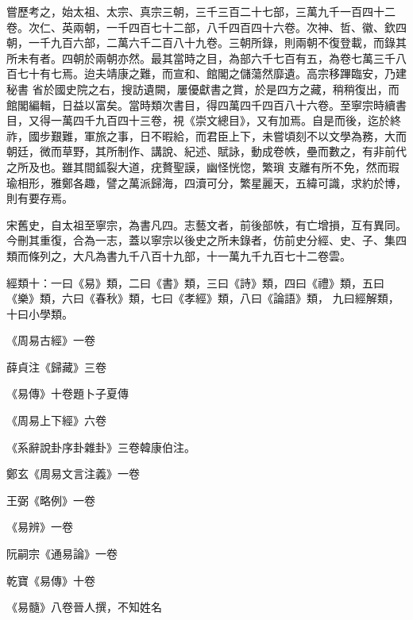 \begin{pinyinscope}
 嘗歷考之，始太祖、太宗、真宗三朝，三千三百二十七部，三萬九千一百四十二卷。次仁、英兩朝，一千四百七十二部，八千四百四十六卷。次神、哲、徽、欽四朝，一千九百六部，二萬六千二百八十九卷。三朝所錄，則兩朝不復登載，而錄其所未有者。四朝於兩朝亦然。最其當時之目，為部六千七百有五，為卷七萬三千八百七十有七焉。迨夫靖康之難，而宣和、館閣之儲蕩然靡遺。高宗移蹕臨安，乃建秘書
 省於國史院之右，搜訪遺闕，屢優獻書之賞，於是四方之藏，稍稍復出，而館閣編輯，日益以富矣。當時類次書目，得四萬四千四百八十六卷。至寧宗時續書目，又得一萬四千九百四十三卷，視《崇文總目》，又有加焉。自是而後，迄於終祚，國步艱難，軍旅之事，日不暇給，而君臣上下，未嘗頃刻不以文學為務，大而朝廷，微而草野，其所制作、講說、紀述、賦詠，動成卷帙，壘而數之，有非前代之所及也。雖其間鈲裂大道，疣贅聖謨，幽怪恍惚，繁瑣
 支離有所不免，然而瑕瑜相形，雅鄭各趣，譬之萬派歸海，四瀆可分，繁星麗天，五緯可識，求約於博，則有要存焉。



 宋舊史，自太祖至寧宗，為書凡四。志藝文者，前後部帙，有亡增損，互有異同。今刪其重復，合為一志，蓋以寧宗以後史之所未錄者，仿前史分經、史、子、集四類而條列之，大凡為書九千八百十九部，十一萬九千九百七十二卷雲。



 經類十：一曰《易》類，二曰《書》類，三曰《詩》類，四曰《禮》類，五曰《樂》類，六曰《春秋》類，七曰《孝經》類，八曰《論語》類，
 九曰經解類，十曰小學類。



 《周易古經》一卷



 薛貞注《歸藏》三卷



 《易傳》十卷題卜子夏傳



 《周易上下經》六卷



 《系辭說卦序卦雜卦》三卷韓康伯注。



 鄭玄《周易文言注義》一卷



 王弼《略例》一卷



 《易辨》一卷



 阮嗣宗《通易論》一卷



 乾寶《易傳》十卷



 《易髓》八卷晉人撰，不知姓名




\end{pinyinscope}
